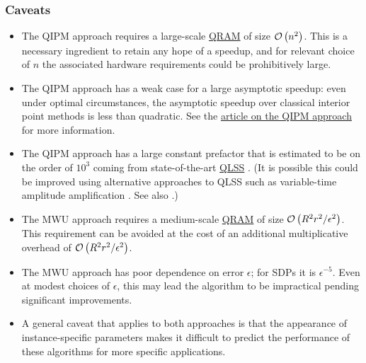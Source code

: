 \begin{refsection}
\subsubsection*{Caveats}
\begin{itemize}
\item The QIPM approach requires a large-scale \hyperref[prim:QRAM]{QRAM} of size $\mathcal{O}\left( n^2 \right)$. This is a necessary ingredient to retain any hope of a speedup, and for relevant choice of $n$ the associated hardware requirements could be prohibitively large. 
%
\item The QIPM approach has a weak case for a large asymptotic speedup: even under optimal circumstances, the asymptotic speedup over classical interior point methods is less than quadratic. See the \hyperref[prim:QIPM]{article on the QIPM approach} for more information.
%
\item The QIPM approach has a large constant prefactor that is estimated to be on the order of $10^3$ coming from state-of-the-art \hyperref[prim:QuantumLinearSystemSolvers]{QLSS} \cite{costa2021OptimalLinearSystem,jennings2023QLSS}. (It is possible this could be improved using alternative approaches to QLSS such as variable-time amplitude amplification \cite{ambainis2010VTAA}. See also \cite{jennings2023QLSS}.) 
%
\item The MWU approach requires a medium-scale \hyperref[prim:QRAM]{QRAM} of size $\mathcal{O}\left( R^2r^2/\epsilon^2 \right)$. This requirement can be avoided at the cost of an additional multiplicative overhead of $\mathcal{O}\left( R^2r^2/\epsilon^2 \right)$. 
\item The MWU approach has poor dependence on error $\epsilon$; for SDPs it is $\epsilon^{-5}$. Even at modest choices of $\epsilon$, this may lead the algorithm to be impractical pending significant improvements. 
%
\item A general caveat that applies to both approaches is that the appearance of instance-specific parameters makes it difficult to predict the performance of these algorithms for more specific applications. 
\end{itemize}


\end{refsection}
